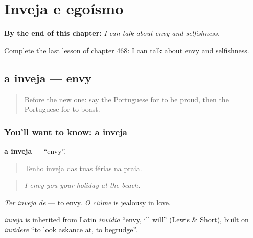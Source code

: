 
\chapter{Inveja e egoísmo}
\label{ch:pt-inveja-e-egoismo}

\begin{chapteropening}
\textbf{By the end of this chapter:} \emph{I can talk about envy and selfishness.}

Complete the last lesson of chapter 468: I can talk about envy and selfishness.
\end{chapteropening}

\section[a inveja]{a inveja — envy}

\label{lesson:PT-C468-inveja}



\begin{quote}
Before the new one: say the Portuguese for to be proud, then the Portuguese for to boast.
\end{quote}

\subsection*{You'll want to know: a inveja}
\textbf{a inveja} — \textquotedblleft{}envy\textquotedblright{}.

\begin{quote}
Tenho inveja das tuas férias na praia.
\end{quote}

\begin{quote}
\emph{I envy you your holiday at the beach.}
\end{quote}

\emph{Ter inveja de} — to envy. \emph{O ciúme} is jealousy in love.

\begin{cousinweb}
\emph{inveja} is inherited from Latin \emph{invidia} \textquotedblleft{}envy, ill will\textquotedblright{} (Lewis \& Short), built on \emph{invidēre} \textquotedblleft{}to look askance at, to begrudge\textquotedblright{}.
\end{cousinweb}

